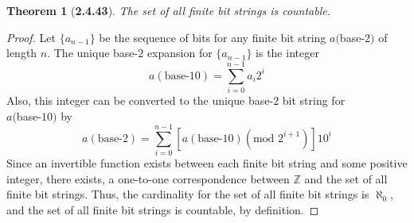\documentclass[a4paper, 12pt]{article}
\theoremstyle{plain}
\newtheorem*{theorem*}{Theorem}
\begin{document}
	
\begin{theorem*}[\textbf{2.4.43}]
    The set of all finite bit strings is countable.
\end{theorem*}

\begin{proof}
    Let $\{a_{n-1}\}$ be the sequence of bits for any finite bit string $a($base-$2)$ of length $n$. 
    The unique base-$2$ expansion for $\{a_{n-1}\}$ is the integer
    $$a(\text{base-}10) = \sum_{i = 0}^{n-1} a_{i}2^{i}$$
    Also, this integer can be converted to the unique base-$2$ bit string for \\ $a($base-$10)$ by 
    $$a(\text{base-}2) = 
    \sum_{i = 0}^{n-1}\left[a(\text{base-}10)(\text{mod } 2^{i+1})\right]10^{i}$$ 
    Since an invertible function exists between each finite bit string and some positive integer, 
    there exists, a one-to-one correspondence between $\mathbb{Z}$ and the set of all 
    finite bit strings. Thus, the cardinality for the set of all finite bit strings is $\aleph_0$,
    and the set of all finite bit strings is countable, by definition.
\end{proof}
\end{document}
